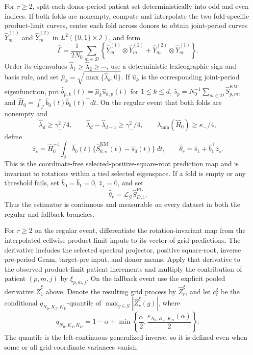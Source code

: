 For \(r\ge2\), split each donor-period patient set deterministically into odd and even indices. If both folds are nonempty, compute and interpolate the two fold-specific product-limit curves, center each fold across donors to obtain joint-period curves \(\widehat Y_m^{(1)}\) and \(\widehat Y_m^{(2)}\) in \(L^2(\{0,1\}\times\mathcal I)\), and form
\[
 \widehat\Gamma=\frac{1}{2N_0}\sum_{m\in\mathcal D}
 \left\{\widehat Y_m^{(1)}\otimes\widehat Y_m^{(2)}+
 \widehat Y_m^{(2)}\otimes\widehat Y_m^{(1)}\right\}.
\]
Order its eigenvalues \(\widehat\lambda_1\ge\widehat\lambda_2\ge\cdots\), use a deterministic lexicographic sign and basis rule, and set \(\widehat\mu_k=\sqrt{\max\{\widehat\lambda_k,0\}}\). If \(\widehat u_k\) is the corresponding joint-period eigenfunction, put \(\widehat b_{p,k}(t)=\widehat\mu_k\widehat u_{k,p}(t)\) for \(1\le k\le d\), \(\widehat s_p=N_0^{-1}\sum_{m\in\mathcal D}\widehat S^{\mathrm{KM}}_{p,m}\), and \(\widehat H_0=\int_{\mathcal I}\widehat b_0(t)\widehat b_0(t)^\top dt\). On the regular event that both folds are nonempty and
\[
 \widehat\lambda_d\ge\gamma_-^2/4,
 \qquad
 \widehat\lambda_d-\widehat\lambda_{d+1}\ge\gamma_-^2/4,
 \qquad
 \lambda_{\min}(\widehat H_0)\ge\kappa_-/4,
\]
define
\[
 \widehat z_\star=\widehat H_0^{-1}\int_{\mathcal I}\widehat b_0(t)
 \{\widehat S^{\mathrm{KM}}_{0,\star}(t)-\widehat s_0(t)\}\,dt,
 \qquad
 \widehat\theta_r=\widehat s_1+\widehat b_1^\top\widehat z_\star.
\]
This is the coordinate-free selected-positive-square-root prediction map and is invariant to rotations within a tied selected eigenspace. If a fold is empty or any threshold fails, set \(\widehat b_0=\widehat b_1=0\), \(\widehat z_\star=0\), and set
\[
 \widehat\theta_r=\mathcal L_{\mathcal G}\widehat S^{\mathrm{PL}}_{D,1}.
\]
Thus the estimator is continuous and measurable on every dataset in both the regular and fallback branches.

For \(r\ge2\) on the regular event, differentiate the rotation-invariant map from the interpolated cellwise product-limit inputs to its vector of grid predictions. The derivative includes the selected spectral projector, positive square-root, inverse pre-period Gram, target-pre input, and donor means. Apply that derivative to the observed product-limit patient increments and multiply the contribution of patient \((p,m,j)\) by \(\xi_{p,m,j}\). On the fallback event use the explicit pooled derivative \(\widehat Z_1^\xi\) above. Denote the resulting grid process by \(\widehat Z_r^\xi\), and let \(c_r^\xi\) be the conditional \(q_{N_0,K_T,K_D}\)-quantile of \(\max_{g\in\mathcal G}|\widehat Z_r^\xi(g)|\), where
\[
 q_{N_0,K_T,K_D}=1-\alpha+
 \min\left\{\frac{\alpha}{2},
 \frac{\varepsilon_{N_0,K_T,K_D}(\alpha)}{2}\right\}.
\]
The quantile is the left-continuous generalized inverse, so it is defined even when some or all grid-coordinate variances vanish.

